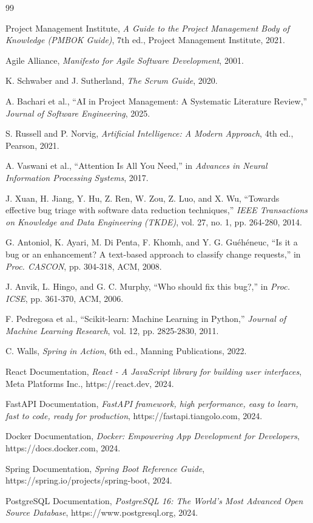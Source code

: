 \documentclass[12pt,a4paper]{report}
\begin{document}
\begin{thebibliography}{99}

Project Management Institute, \emph{A Guide to the Project Management Body of Knowledge (PMBOK Guide)}, 7th ed., Project Management Institute, 2021.

Agile Alliance, \emph{Manifesto for Agile Software Development}, 2001.

K. Schwaber and J. Sutherland, \emph{The Scrum Guide}, 2020.

A. Bachari et al., ``AI in Project Management: A Systematic Literature Review,'' \emph{Journal of Software Engineering}, 2025.

S. Russell and P. Norvig, \emph{Artificial Intelligence: A Modern Approach}, 4th ed., Pearson, 2021.

A. Vaswani et al., ``Attention Is All You Need,'' in \emph{Advances in Neural Information Processing Systems}, 2017.

J. Xuan, H. Jiang, Y. Hu, Z. Ren, W. Zou, Z. Luo, and X. Wu, ``Towards effective bug triage with software data reduction techniques,'' \emph{IEEE Transactions on Knowledge and Data Engineering (TKDE)}, vol. 27, no. 1, pp. 264-280, 2014.

G. Antoniol, K. Ayari, M. Di Penta, F. Khomh, and Y. G. Guéhéneuc, ``Is it a bug or an enhancement? A text-based approach to classify change requests,'' in \emph{Proc. CASCON}, pp. 304-318, ACM, 2008.

J. Anvik, L. Hingo, and G. C. Murphy, ``Who should fix this bug?,'' in \emph{Proc. ICSE}, pp. 361-370, ACM, 2006.

F. Pedregosa et al., ``Scikit-learn: Machine Learning in Python,'' \emph{Journal of Machine Learning Research}, vol. 12, pp. 2825-2830, 2011.

C. Walls, \emph{Spring in Action}, 6th ed., Manning Publications, 2022.

React Documentation, \emph{React - A JavaScript library for building user interfaces}, Meta Platforms Inc., https://react.dev, 2024.

FastAPI Documentation, \emph{FastAPI framework, high performance, easy to learn, fast to code, ready for production}, https://fastapi.tiangolo.com, 2024.

Docker Documentation, \emph{Docker: Empowering App Development for Developers}, https://docs.docker.com, 2024.

Spring Documentation, \emph{Spring Boot Reference Guide}, https://spring.io/projects/spring-boot, 2024.

PostgreSQL Documentation, \emph{PostgreSQL 16: The World's Most Advanced Open Source Database}, https://www.postgresql.org, 2024.

\end{thebibliography}
\end{document}
